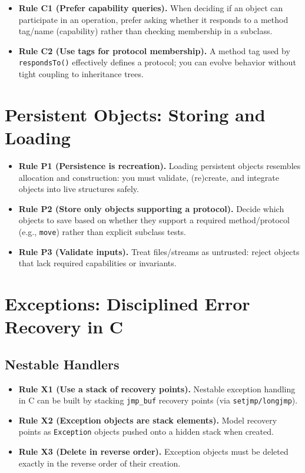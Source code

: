 \documentclass[11pt]{article}
\begin{document}
\begin{itemize}
  \item \textbf{Rule C1 (Prefer capability queries).} When deciding if an object can participate in an operation, prefer asking whether it responds to a method tag/name (capability) rather than checking membership in a subclass.
  \item \textbf{Rule C2 (Use tags for protocol membership).} A method tag used by \texttt{respondsTo()} effectively defines a protocol; you can evolve behavior without tight coupling to inheritance trees.
\end{itemize}

\section{Persistent Objects: Storing and Loading}

\begin{itemize}
  \item \textbf{Rule P1 (Persistence is recreation).} Loading persistent objects resembles allocation and construction: you must validate, (re)create, and integrate objects into live structures safely.
  \item \textbf{Rule P2 (Store only objects supporting a protocol).} Decide which objects to save based on whether they support a required method/protocol (e.g., \texttt{move}) rather than explicit subclass tests.
  \item \textbf{Rule P3 (Validate inputs).} Treat files/streams as untrusted: reject objects that lack required capabilities or invariants.
\end{itemize}

\section{Exceptions: Disciplined Error Recovery in C}

\subsection{Nestable Handlers}

\begin{itemize}
  \item \textbf{Rule X1 (Use a stack of recovery points).} Nestable exception handling in C can be built by stacking \texttt{jmp\_buf} recovery points (via \texttt{setjmp/longjmp}).
  \item \textbf{Rule X2 (Exception objects are stack elements).} Model recovery points as \texttt{Exception} objects pushed onto a hidden stack when created.
  \item \textbf{Rule X3 (Delete in reverse order).} Exception objects must be deleted exactly in the reverse order of their creation.
\end{itemize}
\end{document}
